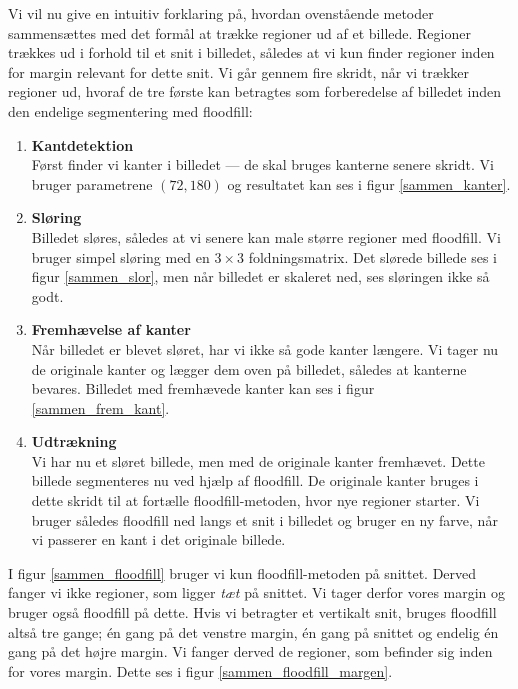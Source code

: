 {
Vi vil nu give en intuitiv forklaring på, hvordan ovenstående metoder
sammensættes med det formål at trække regioner ud af et billede.
Regioner trækkes ud i forhold til et snit i billedet, således at vi kun
finder regioner inden for margin relevant for dette snit. Vi går gennem
fire skridt, når vi trækker regioner ud, hvoraf de tre første kan
betragtes som forberedelse af billedet inden den endelige segmentering med floodfill:

\begin{enumerate}
    \item \textbf{Kantdetektion}\\
Først finder vi kanter i billedet --- de skal bruges kanterne senere
skridt. Vi bruger parametrene $(72, 180)$ og resultatet kan ses i figur
\ref{sammen_kanter}.

\item \textbf{Sløring}\\
Billedet sløres, således at vi senere kan male større regioner med
floodfill. Vi bruger simpel sløring med en $3\times3$ foldningsmatrix.
Det slørede billede ses i figur \ref{sammen_slor}, men når
billedet er skaleret ned, ses sløringen ikke så godt.

\item \textbf{Fremhævelse af kanter}\\
Når billedet er blevet sløret, har vi ikke så gode kanter længere. Vi
tager nu de originale kanter og lægger dem oven på billedet, således at
kanterne bevares. Billedet med fremhævede kanter kan ses i figur
\ref{sammen_frem_kant}.

\item \textbf{Udtrækning}\\
Vi har nu et sløret billede, men med de originale kanter fremhævet.
Dette billede segmenteres nu ved hjælp af floodfill. De originale kanter
bruges i dette skridt til at fortælle floodfill-metoden, hvor nye
regioner starter. Vi bruger således floodfill ned langs et snit i
billedet og bruger en ny farve, når vi passerer en kant i det originale
billede.
\end{enumerate}

I figur \ref{sammen_floodfill} bruger vi kun floodfill-metoden på
snittet. Derved fanger vi ikke regioner, som ligger \emph{tæt} på
snittet. Vi tager derfor vores margin og bruger også floodfill på dette.
Hvis vi betragter et vertikalt snit, bruges floodfill altså tre gange;
én gang på det venstre margin, én gang på snittet og endelig én gang på
det højre margin. Vi fanger derved de regioner, som befinder sig inden
for vores margin. Dette ses i figur \ref{sammen_floodfill_margen}.

}

